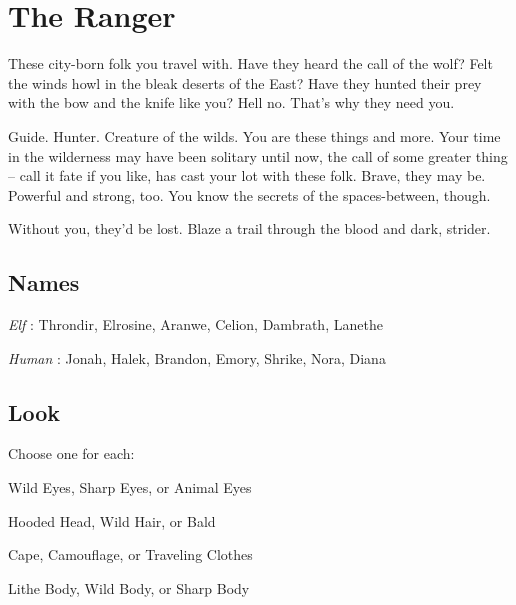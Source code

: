 \chapter{The Ranger}
  
 





These city-born folk you travel with. Have they heard the call of the wolf? Felt the winds howl in the bleak deserts of the East? Have they hunted their prey with the bow and the knife like you? Hell no. That’s why they need you.

 

Guide. Hunter. Creature of the wilds. You are these things and more. Your time in the wilderness may have been solitary until now, the call of some greater thing – call it fate if you like, has cast your lot with these folk. Brave, they may be. Powerful and strong, too. You know the secrets of the spaces-between, though.

 

Without you, they’d be lost. Blaze a trail through the blood and dark, strider.



 
\section{Names}   
 



{\em Elf} : Throndir, Elrosine, Aranwe, Celion, Dambrath, Lanethe

  

{\em Human} : Jonah, Halek, Brandon, Emory, Shrike, Nora, Diana



 
\section{Look}  
 



Choose one for each:

 

Wild Eyes, Sharp Eyes, or Animal Eyes

 

Hooded Head, Wild Hair, or Bald

 

Cape, Camouflage, or Traveling Clothes

 

Lithe Body, Wild Body, or Sharp Body



